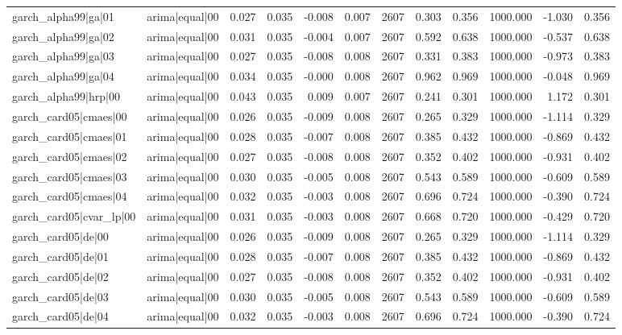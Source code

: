 \begin{table}
\begin{tabular}{llrrrrrrrrrr}
garch\_alpha99|ga|01 & arima|equal|00 & 0.027 & 0.035 & -0.008 & 0.007 & 2607 & 0.303 & 0.356 & 1000.000 & -1.030 & 0.356 \\
garch\_alpha99|ga|02 & arima|equal|00 & 0.031 & 0.035 & -0.004 & 0.007 & 2607 & 0.592 & 0.638 & 1000.000 & -0.537 & 0.638 \\
garch\_alpha99|ga|03 & arima|equal|00 & 0.027 & 0.035 & -0.008 & 0.008 & 2607 & 0.331 & 0.383 & 1000.000 & -0.973 & 0.383 \\
garch\_alpha99|ga|04 & arima|equal|00 & 0.034 & 0.035 & -0.000 & 0.008 & 2607 & 0.962 & 0.969 & 1000.000 & -0.048 & 0.969 \\
garch\_alpha99|hrp|00 & arima|equal|00 & 0.043 & 0.035 & 0.009 & 0.007 & 2607 & 0.241 & 0.301 & 1000.000 & 1.172 & 0.301 \\
garch\_card05|cmaes|00 & arima|equal|00 & 0.026 & 0.035 & -0.009 & 0.008 & 2607 & 0.265 & 0.329 & 1000.000 & -1.114 & 0.329 \\
garch\_card05|cmaes|01 & arima|equal|00 & 0.028 & 0.035 & -0.007 & 0.008 & 2607 & 0.385 & 0.432 & 1000.000 & -0.869 & 0.432 \\
garch\_card05|cmaes|02 & arima|equal|00 & 0.027 & 0.035 & -0.008 & 0.008 & 2607 & 0.352 & 0.402 & 1000.000 & -0.931 & 0.402 \\
garch\_card05|cmaes|03 & arima|equal|00 & 0.030 & 0.035 & -0.005 & 0.008 & 2607 & 0.543 & 0.589 & 1000.000 & -0.609 & 0.589 \\
garch\_card05|cmaes|04 & arima|equal|00 & 0.032 & 0.035 & -0.003 & 0.008 & 2607 & 0.696 & 0.724 & 1000.000 & -0.390 & 0.724 \\
garch\_card05|cvar\_lp|00 & arima|equal|00 & 0.031 & 0.035 & -0.003 & 0.008 & 2607 & 0.668 & 0.720 & 1000.000 & -0.429 & 0.720 \\
garch\_card05|de|00 & arima|equal|00 & 0.026 & 0.035 & -0.009 & 0.008 & 2607 & 0.265 & 0.329 & 1000.000 & -1.114 & 0.329 \\
garch\_card05|de|01 & arima|equal|00 & 0.028 & 0.035 & -0.007 & 0.008 & 2607 & 0.385 & 0.432 & 1000.000 & -0.869 & 0.432 \\
garch\_card05|de|02 & arima|equal|00 & 0.027 & 0.035 & -0.008 & 0.008 & 2607 & 0.352 & 0.402 & 1000.000 & -0.931 & 0.402 \\
garch\_card05|de|03 & arima|equal|00 & 0.030 & 0.035 & -0.005 & 0.008 & 2607 & 0.543 & 0.589 & 1000.000 & -0.609 & 0.589 \\
garch\_card05|de|04 & arima|equal|00 & 0.032 & 0.035 & -0.003 & 0.008 & 2607 & 0.696 & 0.724 & 1000.000 & -0.390 & 0.724 \\

\end{tabular}
\end{table}
